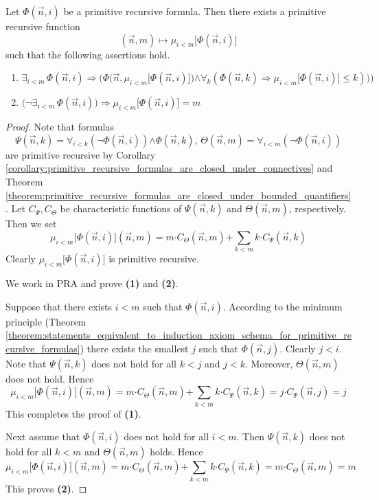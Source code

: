 \documentclass[10pt]{amsart}
\newcommand{\mforall}{\boldsymbol{\forall}}
\newcommand{\mexists}{\boldsymbol{\exists}}
\newcommand{\mra}{\boldsymbol{\Rightarrow}}
\newcommand{\mand}{\boldsymbol{\wedge}}
\newcommand{\mneg}{\boldsymbol{\neg}}
\newcommand{\mle}{\boldsymbol{<}}
\newcommand{\mleq}{\boldsymbol{\leq}}
\newcommand{\meq}{\boldsymbol{=}}
\newcommand{\mplus}{\boldsymbol{+}}
\newcommand{\mdot}{\boldsymbol{\cdot}}
\begin{document}
\begin{theorem}\label{theorem:existence_of_bounded_minimum_for_primitive_recursive_formula}
	Let $\Phi(\vec{n},i)$ be a primitive recursive formula. Then there exists a primitive recursive function
	$$(\vec{n},m) \mapsto \mu_{i \mle m}\big[\Phi(\vec{n},i)\big]$$
	such that the following assertions hold.
	\begin{enumerate}[label=\emph{\textbf{(\arabic*)}}]
		\item	$\mexists_{i \mle m}\,\Phi(\vec{n},i) \mra \bigg(\Phi\big(\vec{n},\mu_{i \mle m}\big[\Phi(\vec{n},i)\big]\big) \mand \mforall_{k}\left(\Phi(\vec{n},k) \mra \mu_{i \mle m}\big[\Phi(\vec{n},i)\big]\mleq k\right)\big)\bigg)$
		\item $\bigg(\mneg \mexists_{i \mle m}\,\Phi(\vec{n},i)\bigg) \mra \mu_{i \mle m}\big[\Phi(\vec{n},i)\big] \meq m$
	\end{enumerate}
\end{theorem}
\begin{proof}
	Note that formulas
	$$\Psi(\vec{n},k) \meq \mforall_{i \mle k}\left(\mneg \Phi(\vec{n},i)\right) \mand \Phi(\vec{n},k),\,\Theta(\vec{n},m) \meq \mforall_{i \mle m}\left(\mneg \Phi(\vec{n},i)\right)$$
	are primitive recursive by Corollary \ref{corollary:primitive_recursive_formulas_are_closed_under_connectives} and Theorem \ref{theorem:primitive_recursive_formulas_are_closed_under_bounded_quantifiers}. Let $C_{\Psi},C_{\Theta}$ be characteristic functions of $\Psi(\vec{n},k)$ and $\Theta(\vec{n},m)$, respectively. Then we set
	$$\mu_{i \mle m}\big[\Phi(\vec{n},i)\big](\vec{n},m) \meq m\mdot C_{\Theta}(\vec{n},m) \mplus \sum_{k \mle m}k\mdot C_{\Psi}(\vec{n},k)$$
	Clearly $\mu_{i \mle m}\big[\Phi(\vec{n},i)\big]$ is primitive recursive.

	We work in $\mathrm{PRA}$ and prove \textbf{(1)} and \textbf{(2)}.

	Suppose that there exists $i \mle m$ such that $\Phi(\vec{n},i)$. According to the minimum principle (Theorem \ref{theorem:statements_equivalent_to_induction_axiom_schema_for_primitive_recursive_formulas}) there exists the smallest $j$ such that $\Phi(\vec{n},j)$. Clearly $j \mle i$. Note that $\Psi(\vec{n},k)$ does not hold for all $k \mle j$ and $j \mle k$. Moreover, $\Theta(\vec{n},m)$ does not hold. Hence
	$$\mu_{i \mle m}\big[\Phi(\vec{n},i)\big](\vec{n},m) \meq m\mdot C_{\Theta}(\vec{n},m) \mplus \sum_{k \mle m}k\mdot C_{\Psi}(\vec{n},k) \meq j\mdot C_{\Psi}(\vec{n},j) \meq j$$
	This completes the proof of \textbf{(1)}.

	Next assume that $\Phi(\vec{n},i)$ does not hold for all $i \mle m$. Then $\Psi(\vec{n},k)$ does not hold for all $k \mle m$ and $\Theta(\vec{n},m)$ holds. Hence
	$$\mu_{i \mle m}\big[\Phi(\vec{n},i)\big](\vec{n},m) \meq m\mdot C_{\Theta}(\vec{n},m) \mplus \sum_{k \mle m}k\mdot C_{\Psi}(\vec{n},k) \meq m\mdot C_{\Theta}(\vec{n},m) \meq m$$
	This proves \textbf{(2)}.
\end{proof}
\end{document}
